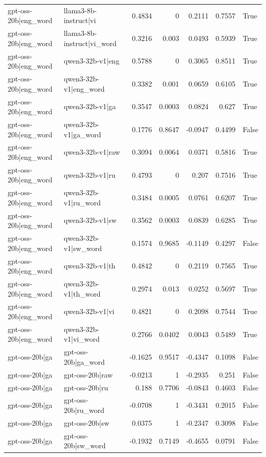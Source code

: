 \begin{table}
\begin{tabular}{l l r r r r l}
gpt-oss-20b|eng_word & llama3-8b-instruct|vi & 0.4834 & 0 & 0.2111 & 0.7557 & True \\
gpt-oss-20b|eng_word & llama3-8b-instruct|vi_word & 0.3216 & 0.003 & 0.0493 & 0.5939 & True \\
gpt-oss-20b|eng_word & qwen3-32b-v1|eng & 0.5788 & 0 & 0.3065 & 0.8511 & True \\
gpt-oss-20b|eng_word & qwen3-32b-v1|eng_word & 0.3382 & 0.001 & 0.0659 & 0.6105 & True \\
gpt-oss-20b|eng_word & qwen3-32b-v1|ga & 0.3547 & 0.0003 & 0.0824 & 0.627 & True \\
gpt-oss-20b|eng_word & qwen3-32b-v1|ga_word & 0.1776 & 0.8647 & -0.0947 & 0.4499 & False \\
gpt-oss-20b|eng_word & qwen3-32b-v1|raw & 0.3094 & 0.0064 & 0.0371 & 0.5816 & True \\
gpt-oss-20b|eng_word & qwen3-32b-v1|ru & 0.4793 & 0 & 0.207 & 0.7516 & True \\
gpt-oss-20b|eng_word & qwen3-32b-v1|ru_word & 0.3484 & 0.0005 & 0.0761 & 0.6207 & True \\
gpt-oss-20b|eng_word & qwen3-32b-v1|sw & 0.3562 & 0.0003 & 0.0839 & 0.6285 & True \\
gpt-oss-20b|eng_word & qwen3-32b-v1|sw_word & 0.1574 & 0.9685 & -0.1149 & 0.4297 & False \\
gpt-oss-20b|eng_word & qwen3-32b-v1|th & 0.4842 & 0 & 0.2119 & 0.7565 & True \\
gpt-oss-20b|eng_word & qwen3-32b-v1|th_word & 0.2974 & 0.013 & 0.0252 & 0.5697 & True \\
gpt-oss-20b|eng_word & qwen3-32b-v1|vi & 0.4821 & 0 & 0.2098 & 0.7544 & True \\
gpt-oss-20b|eng_word & qwen3-32b-v1|vi_word & 0.2766 & 0.0402 & 0.0043 & 0.5489 & True \\
gpt-oss-20b|ga & gpt-oss-20b|ga_word & -0.1625 & 0.9517 & -0.4347 & 0.1098 & False \\
gpt-oss-20b|ga & gpt-oss-20b|raw & -0.0213 & 1 & -0.2935 & 0.251 & False \\
gpt-oss-20b|ga & gpt-oss-20b|ru & 0.188 & 0.7706 & -0.0843 & 0.4603 & False \\
gpt-oss-20b|ga & gpt-oss-20b|ru_word & -0.0708 & 1 & -0.3431 & 0.2015 & False \\
gpt-oss-20b|ga & gpt-oss-20b|sw & 0.0375 & 1 & -0.2347 & 0.3098 & False \\
gpt-oss-20b|ga & gpt-oss-20b|sw_word & -0.1932 & 0.7149 & -0.4655 & 0.0791 & False \\

\end{tabular}
\end{table}
